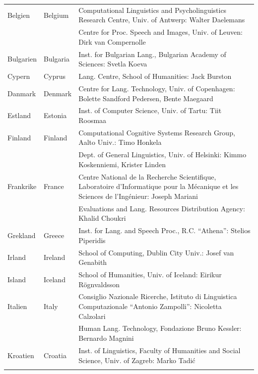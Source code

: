 \small
\begin{longtable}{llp{105mm}}
  Belgien & \textcolor{grey1}{Belgium} & Computational Linguistics and Psycholinguistics Research Centre, Univ. of Antwerp: Walter Daelemans\\ \addlinespace
  & & Centre for Proc. Speech and Images, Univ. of Leuven: Dirk van Compernolle \\ \addlinespace
  Bulgarien & \textcolor{grey1}{Bulgaria} & Inst. for Bulgarian Lang., Bulgarian Academy of Sciences: Svetla Koeva \\ \addlinespace
  Cypern & \textcolor{grey1}{Cyprus} & Lang. Centre, School of Humanities: Jack Burston \\ \addlinespace
  Danmark &  \textcolor{grey1}{Denmark} & Centre for Lang. Technology, Univ. of Copenhagen: Bolette Sandford Pedersen, Bente Maegaard\\ \addlinespace
  Estland & \textcolor{grey1}{Estonia} & Inst. of Computer Science, Univ. of Tartu: Tiit Roosmaa\\ \addlinespace
  Finland & \textcolor{grey1}{Finland} & Computational Cognitive Systems Research Group, Aalto Univ.: Timo Honkela\\ \addlinespace
  & & Dept. of General Linguistics, Univ. of Helsinki: Kimmo Koskenniemi, Krister Linden \\ \addlinespace
  Frankrike & \textcolor{grey1}{France} & Centre National de la Recherche Scientifique, Laboratoire d'Informatique pour la Mécanique et les Sciences de l'Ingénieur: Joseph Mariani \\ \addlinespace
  & & Evaluations and Lang. Resources Distribution Agency: Khalid Choukri\\ \addlinespace 
  Grekland & \textcolor{grey1}{Greece} & Inst. for Lang. and Speech Proc., R.C. “Athena”: Stelios Piperidis\\ \addlinespace
  Irland & \textcolor{grey1}{Ireland} & School of Computing, Dublin City Univ.: Josef van Genabith\\ \addlinespace
  Island & \textcolor{grey1}{Iceland} & School of Humanities, Univ. of Iceland: Eirikur Rögnvaldsson\\ \addlinespace
  Italien & \textcolor{grey1}{Italy} & Consiglio Nazionale Ricerche, Istituto di Linguistica Computazionale “Antonio Zampolli”: Nicoletta Calzolari\\ \addlinespace
  & & Human Lang. Technology, Fondazione Bruno Kessler: Bernardo Magnini\\ \addlinespace 
  Kroatien & \textcolor{grey1}{Croatia} & Inst. of Linguistics, Faculty of Humanities and Social Science, Univ. of Zagreb: Marko Tadić \\ \addlinespace

\end{longtable}
